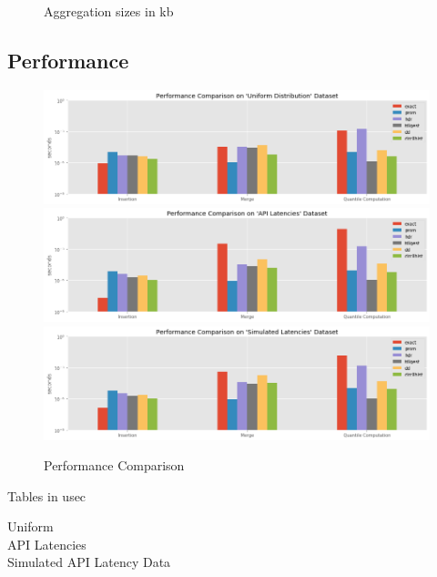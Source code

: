 \documentclass{article}
\theoremstyle{plain}
\theoremstyle{remark}
\begin{document}
\begin{figure}
  \centering
  
  \caption{Aggregation sizes in kb}
\end{figure}

\clearpage
\subsection{Performance}

\begin{figure}
  \includegraphics[width=\textwidth]{evaluation/images/Uniform_Distribution_perf.png}
  \includegraphics[width=\textwidth]{evaluation/images/API_Latencies_perf.png}
  \includegraphics[width=\textwidth]{evaluation/images/Simulated_Latencies_perf.png}
  \caption{Performance Comparison}
\end{figure}

Tables in usec

Uniform\\


API Latencies\\


Simulated API Latency Data\\

\end{document}
